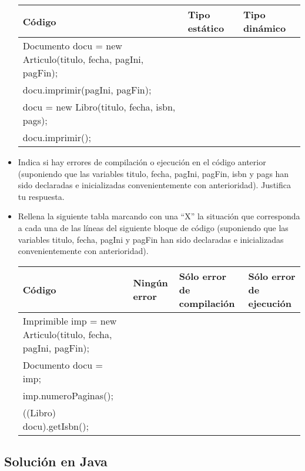 \documentclass[a4paper,12pt]{article}
\begin{document}
\begin{itemize}
    \begin{table}[H]
        \centering
        \begin{tabular}{|l|l|l|}
            \hline
            \textbf{Código} & \textbf{Tipo estático} & \textbf{Tipo dinámico} \\ \hline
            Documento docu = new Articulo(titulo, fecha, pagIni, pagFin); &  &  \\ \hline
            docu.imprimir(pagIni, pagFin); &  &  \\ \hline
            docu = new Libro(titulo, fecha, isbn, pags); &  &  \\ \hline
            docu.imprimir(); &  &  \\ \hline
        \end{tabular}
    \end{table}
    \item Indica si hay errores de compilación o ejecución en el código anterior (suponiendo que las variables titulo, fecha, pagIni, pagFin, isbn y pags han sido declaradas e inicializadas convenientemente con anterioridad). Justifica tu respuesta.
    \item Rellena la siguiente tabla marcando con una “X” la situación que corresponda a cada una de las líneas del siguiente bloque de código (suponiendo que las variables titulo, fecha, pagIni y pagFin han sido declaradas e inicializadas convenientemente con anterioridad).
    \begin{table}[H]
        \centering
        \begin{tabular}{|p{4cm}|p{4cm}|p{4cm}|p{4cm}|}
            \hline
            \textbf{Código} & \textbf{Ningún error} & \textbf{Sólo error de compilación} & \textbf{Sólo error de ejecución} \\ \hline
            Imprimible imp = new Articulo(titulo, fecha, pagIni, pagFin); &  &  &  \\ \hline
            Documento docu = imp; &  &  &  \\ \hline
            imp.numeroPaginas(); &  &  &  \\ \hline
            ((Libro) docu).getIsbn(); &  &  &  \\ \hline
        \end{tabular}
    \end{table}
\end{itemize}

\subsection{Solución en Java}
\end{document}
